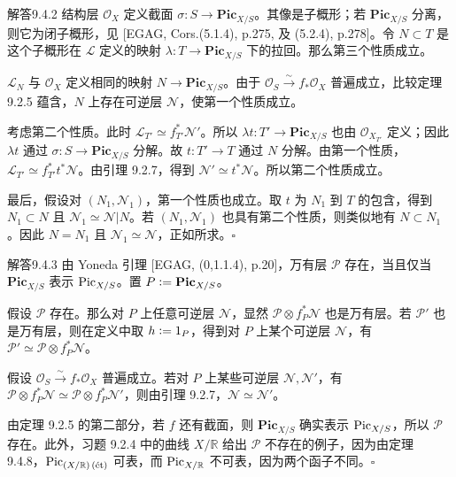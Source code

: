 \begin{origstatement}{解答}{9.4.2}\label{appA:ans942}
结构层 $\mathcal O_X$ 定义截面 $\sigma\colon S\to\mathbf{Pic}_{X/S}$。其像是子概形；若 $\mathbf{Pic}_{X/S}$ 分离，则它为闭子概形，见 [EGAG, Cors.(5.1.4), p.275, 及 (5.2.4), p.278]。令 $N\subset T$ 是这个子概形在 $\mathcal L$ 定义的映射 $\lambda\colon T\to\mathbf{Pic}_{X/S}$ 下的拉回。那么第三个性质成立。

$\mathcal L_N$ 与 $\mathcal O_X$ 定义相同的映射 $N\to\mathbf{Pic}_{X/S}$。由于 $\mathcal O_S\xrightarrow{\sim}f_*\mathcal O_X$ 普遍成立，比较定理 9.2.5 蕴含，$N$ 上存在可逆层 $\mathcal N$，使第一个性质成立。

考虑第二个性质。此时 $\mathcal L_{T'}\simeq f_{T'}^*\mathcal N'$。所以 $\lambda t\colon T'\to\mathbf{Pic}_{X/S}$ 也由 $\mathcal O_{X_{T'}}$ 定义；因此 $\lambda t$ 通过 $\sigma\colon S\to\mathbf{Pic}_{X/S}$ 分解。故 $t\colon T'\to T$ 通过 $N$ 分解。由第一个性质，$\mathcal L_{T'}\simeq f_{T'}^*t^*\mathcal N$。由引理 9.2.7，得到 $\mathcal N'\simeq t^*\mathcal N$。所以第二个性质成立。

最后，假设对 $(N_1,\mathcal N_1)$，第一个性质也成立。取 $t$ 为 $N_1$ 到 $T$ 的包含，得到 $N_1\subset N$ 且 $\mathcal N_1\simeq\mathcal N|N$。若 $(N_1,\mathcal N_1)$ 也具有第二个性质，则类似地有 $N\subset N_1$。因此 $N=N_1$ 且 $\mathcal N_1\simeq\mathcal N$，正如所求。\hfill$\square$
\end{origstatement}

\begin{origstatement}{解答}{9.4.3}\label{appA:ans943}
由 Yoneda 引理 [EGAG, (0,1.1.4), p.20]，万有层 $\mathcal P$ 存在，当且仅当 $\mathbf{Pic}_{X/S}$ 表示 $\operatorname{Pic}_{X/S}$。置 $P\mathrel{\mathop:}=\mathbf{Pic}_{X/S}$。

假设 $\mathcal P$ 存在。那么对 $P$ 上任意可逆层 $\mathcal N$，显然 $\mathcal P\otimes f_P^*\mathcal N$ 也是万有层。若 $\mathcal P'$ 也是万有层，则在定义中取 $h\mathrel{\mathop:}=1_P$，得到对 $P$ 上某个可逆层 $\mathcal N$，有 $\mathcal P'\simeq\mathcal P\otimes f_P^*\mathcal N$。

假设 $\mathcal O_S\xrightarrow{\sim}f_*\mathcal O_X$ 普遍成立。若对 $P$ 上某些可逆层 $\mathcal N,\mathcal N'$，有 $\mathcal P\otimes f_P^*\mathcal N\simeq\mathcal P\otimes f_P^*\mathcal N'$，则由引理 9.2.7，$\mathcal N\simeq\mathcal N'$。

由定理 9.2.5 的第二部分，若 $f$ 还有截面，则 $\mathbf{Pic}_{X/S}$ 确实表示 $\operatorname{Pic}_{X/S}$，所以 $\mathcal P$ 存在。此外，习题 9.2.4 中的曲线 $X/\mathbb R$ 给出 $\mathcal P$ 不存在的例子，因为由定理 9.4.8，$\operatorname{Pic}_{(X/\mathbb R)\,(\text{ét})}$ 可表，而 $\operatorname{Pic}_{X/\mathbb R}$ 不可表，因为两个函子不同。\hfill$\square$
\end{origstatement}

